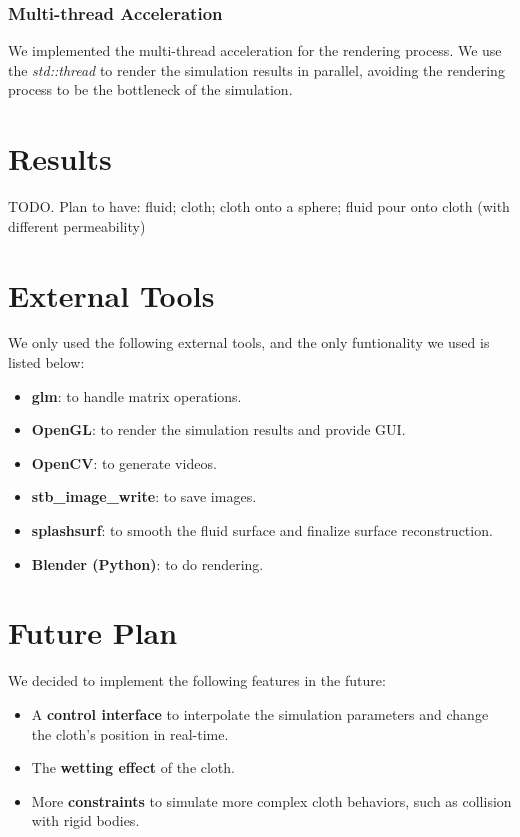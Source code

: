 \subsubsection{Multi-thread Acceleration} We implemented the multi-thread acceleration for the rendering process. We use the \textit{std::thread} to render the simulation results in parallel, avoiding the rendering process to be the bottleneck of the simulation.

\section{Results}

TODO. Plan to have: fluid; cloth; cloth onto a sphere; fluid pour onto cloth (with different permeability)

\section{External Tools}

We only used the following external tools, and the only funtionality we used is listed below:

\begin{itemize}
\item \textbf{glm}: to handle matrix operations.
\item \textbf{OpenGL}: to render the simulation results and provide GUI.
\item \textbf{OpenCV}: to generate videos.
\item \textbf{stb\_image\_write}: to save images.
\item \textbf{splashsurf}: to smooth the fluid surface and finalize surface reconstruction.
\item \textbf{Blender (Python)}: to do rendering.
\end{itemize}

\section{Future Plan}

We decided to implement the following features in the future:

\begin{itemize}
\item A \textbf{control interface} to interpolate the simulation parameters and change the cloth's position in real-time.
\item The \textbf{wetting effect} of the cloth.
\item More \textbf{constraints} to simulate more complex cloth behaviors, such as collision with rigid bodies.
\end{itemize}


